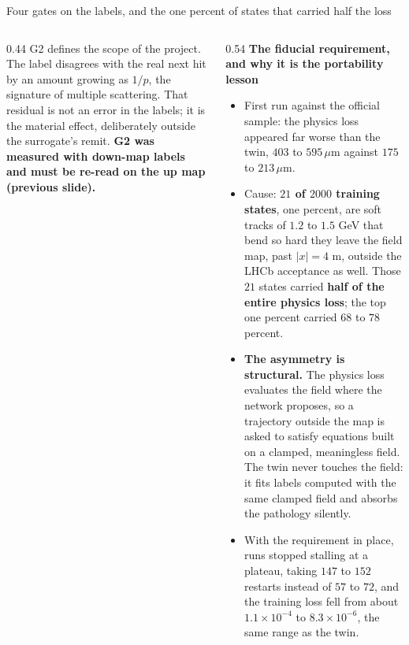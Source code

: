\documentclass[aspectratio=169,10pt]{beamer}
\newcommand{\um}{\ensuremath{\,\mu\mathrm{m}}}
\newcommand{\hl}[1]{{\color{accent}\textbf{#1}}}
\newcommand{\bad}[1]{{\color{warm}\textbf{#1}}}
\begin{document}
\begin{frame}[shrink=25]{Four gates on the labels, and the one percent of states that carried half the loss}
\begin{columns}[T]
\begin{column}{0.44\textwidth}
      {\small G2 defines the scope of the project. The label disagrees with the
       real next hit by an amount growing as $1/p$, the signature of multiple
       scattering. That residual is not an error in the labels; it is the
       material effect, deliberately outside the surrogate's remit.
       \bad{G2 was measured with down-map labels and must be re-read on the up
       map (previous slide).}}
    \end{column}
    \begin{column}{0.54\textwidth}
      \textbf{The fiducial requirement, and why it is the portability lesson}
      \begin{itemize}\small
        \item First run against the official sample: the physics loss appeared
              far worse than the twin, $403$ to $595\um$ against $175$ to
              $213\um$.
        \item Cause: \hl{$21$ of $2000$ training states}, one percent, are soft
              tracks of $1.2$ to $1.5$ GeV that bend so hard they leave the
              field map, past $|x| = 4$ m, outside the LHCb acceptance as well.
              Those $21$ states carried \hl{half of the entire physics loss};
              the top one percent carried $68$ to $78$ percent.
        \item \hl{The asymmetry is structural.} The physics loss evaluates the
              field where the network proposes, so a trajectory outside the map
              is asked to satisfy equations built on a clamped, meaningless
              field. The twin never touches the field: it fits labels computed
              with the same clamped field and absorbs the pathology silently.
        \item With the requirement in place, runs stopped stalling at a plateau,
              taking $147$ to $152$ restarts instead of $57$ to $72$, and the
              training loss fell from about $1.1\times10^{-4}$ to
              $8.3\times10^{-6}$, the same range as the twin.
      \end{itemize}
    \end{column}
  \end{columns}
\end{frame}

\end{document}
